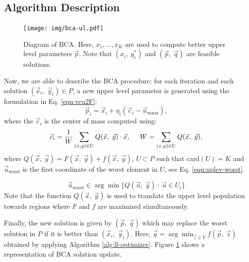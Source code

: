 \documentclass[conference]{IEEEtran}
\begin{document}
\subsection{Algorithm Description} %
\label{sub:algorithm_description}

\begin{figure}[!ht]
    \centering
    \texttt{[image: img/bca-ul.pdf]}
    \caption{Diagram of BCA. Here, $x_1,\ldots,x_K$ are used to compute better
    upper level parameters $\vec{p}$. Note that $(x_i,\ y_i^*)$ and
    $(\vec{p},\ \vec{q})$ are feasible solutions.}
    \label{fig:bca-diag}
\end{figure}

Now, we are able to describe the BCA procedure: for each iteration and each
solution $(\vec{x}_i,\; \vec{y}_i) \in P$, a new upper level parameter is generated
using the formulation in Eq. \ref{eqn:vcu2F}:
% 
\begin{equation}
    \vec{p}_i =  \vec{x}_i + \eta _{i} ( \vec{c}_i - \vec{u}_{ \text{worst} } ),
    \label{eqn:vcu2F}
\end{equation}
% 
%
where the $\vec{c}_i$ is the center of mass computed using:
%
\begin{equation}
    \vec{c}_i = \dfrac{1} {W} \sum_{(x,y) \in U} Q(\vec{x},\ \vec{y}) \cdot \vec{x} , 
            \hspace{0.5cm} 
            W = \sum_{ (x,y) \in U} Q(\vec{x},\ \vec{y}),
    \label{eqn:centerF}
\end{equation} 
% 
where $Q(\vec{x},\ \vec{y}) = F(\vec{x},\ \vec{y}) + f(\vec{x},\ \vec{y})$, $U \subset P $
such that card$(U) = K$  and $\vec{u}_{ \text{worst}}$ is the first coordinate of
the worst element in $U$, see Eq. \ref{eqn:uplev-worst}.

\begin{equation}
    \vec{u}_{\text{worst}} \in \arg \min \{Q(\vec{u}, \ \vec{y} ) 
    \ : \
    \vec{u} \in U_i \}
    \label{eqn:uplev-worst}
\end{equation}
% 
Note that the function $Q(\vec{x},\ \vec{y})$ is used to translate the upper level
population towards regions where $F$ and $f$ are maximized simultaneously.

Finally, the new solution is given by $ (\vec{p}, \ \vec{q}) $ which may 
replace the worst solution in $ P $ if it is better than $(\vec{x}_i,\; \vec{y}_i)$. Here,
$  \vec{q} = \arg \min _ {\vec{z} \in Y} f (\vec{p}, \ \vec{z}) $ obtained
by applying Algorithm \ref{alg:ll-optimizer}. Figure \ref{fig:bca-diag}
shows a representation of BCA solution update. 
\end{document}
